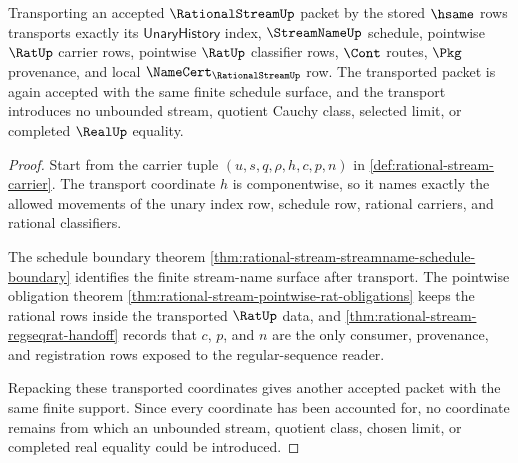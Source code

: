 \begin{theorem}
\label{thm:rational-stream-schedule-transport-exactness}
Transporting an accepted $\RationalStreamUp$ packet by the stored $\hsame$
rows transports exactly its $\mathsf{UnaryHistory}$ index, $\StreamNameUp$
schedule, pointwise $\RatUp$ carrier rows, pointwise $\RatUp$ classifier rows,
$\Cont$ routes, $\Pkg$ provenance, and local $\NameCert_{\RationalStreamUp}$
row. The transported packet is again accepted with the same finite schedule
surface, and the transport introduces no unbounded stream, quotient Cauchy
class, selected limit, or completed $\RealUp$ equality.
\end{theorem}
\begin{proof}
Start from the carrier tuple
$(u,s,q,\rho,h,c,p,n)$ in \autoref{def:rational-stream-carrier}. The transport
coordinate $h$ is componentwise, so it names exactly the allowed movements of
the unary index row, schedule row, rational carriers, and rational
classifiers.

The schedule boundary theorem
\autoref{thm:rational-stream-streamname-schedule-boundary} identifies the
finite stream-name surface after transport. The pointwise obligation theorem
\autoref{thm:rational-stream-pointwise-rat-obligations} keeps the rational
rows inside the transported $\RatUp$ data, and
\autoref{thm:rational-stream-regseqrat-handoff} records that $c$, $p$, and
$n$ are the only consumer, provenance, and registration rows exposed to the
regular-sequence reader.

Repacking these transported coordinates gives another accepted packet with
the same finite support. Since every coordinate has been accounted for, no
coordinate remains from which an unbounded stream, quotient class, chosen
limit, or completed real equality could be introduced.
\end{proof}


